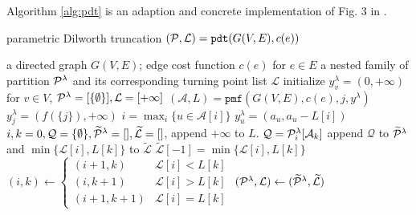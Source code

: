 \documentclass{article}
\begin{document}
Algorithm \ref{alg:pdt} is an adaption and concrete implementation of Fig. 3 in \cite{RN4}.

\begin{algorithm}
	\caption{parametric Dilworth truncation $(\P, \mathcal{L})=\texttt{pdt}(G(V,E), c(e))$}\label{alg:pdt}
	\begin{algorithmic}[1]
		\REQUIRE a directed graph $G(V, E)$; edge cost function $c(e)$ for $e\in E$
		\ENSURE a nested family of partition $\P^{\lambda}$ and its corresponding turning point list $\mathcal{L}$
		\STATE initialize $y^{\lambda}_v = (0, +\infty)$ for $ v \in V$, $\P^{\lambda} = [\{\emptyset\}], \mathcal{L} = [+\infty]$
		\STATE  $(\mathcal{A}, L) = \texttt{pmf}(G(V,E), c(e), j, y^{\lambda})$
		\STATE $y^{\lambda}_j = (f(\{j\}), +\infty)$
		\ELSE
		\STATE $ i = \max_i \{ u \in \mathcal{A}[i]\}$
		\STATE $y_u^{\lambda} = (a_u, a_u - L[i])$
		\ENDIF
		\ENDIF
		\ENDFOR
		\STATE $i, k = 0, \mathcal{Q} = \{\emptyset\}, \widetilde{\mathcal{\P}}^{\lambda} = [], \widetilde{\mathcal{L}} = []$, append $+\infty$ to $L$.
		\STATE $\mathcal{Q} = \P^{\lambda}_i[\mathcal{A}_k]$
		\STATE append $\mathcal{Q}$ to $\widetilde{\mathcal{\P}}^{\lambda}$ and $\min\{\mathcal{L}[i], L[k]\}$
		to $\widetilde{\mathcal{L}}$
		\ELSE
		\STATE $\widetilde{\mathcal{L}}[-1] = \min\{\mathcal{L}[i], L[k]\}$
		\ENDIF
		\STATE $(i, k) \leftarrow \begin{cases} (i+1, k) & \mathcal{L}[i] < L[k] \\  (i, k+1) & \mathcal{L}[i] > L[k]\\ (i+1, k+1) & \mathcal{L}[i] = L[k]\end{cases}$
		\ENDWHILE
		\STATE $(\P^{\lambda}, \mathcal{L}) \leftarrow (\widetilde{\mathcal{\P}}^{\lambda},  \widetilde{\mathcal{L}})$
		\ENDFOR
	\end{algorithmic}
\end{algorithm}
\end{document}
